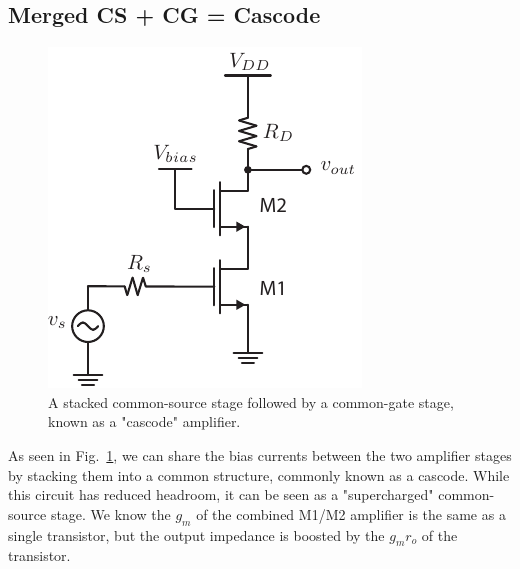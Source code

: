 \subsection{Merged CS + CG = Cascode}
\begin{figure}[tb]
\centering
\includegraphics[scale=1]{10cascode_dc}
\caption{A stacked common-source stage followed by a common-gate stage, known as a "cascode" amplifier.}
\label{fig:10cascode_dc}
\end{figure}
As seen in Fig.~\ref{fig:10cascode_dc}, we can share the bias currents between the two amplifier stages by stacking them into a common structure, commonly known as a cascode.  While this circuit has reduced headroom, it can be seen as a "supercharged" common-source stage.  We know the $g_m$ of the combined M1/M2 amplifier is the same as a single transistor, but the output impedance is boosted by the $g_m r_o$ of the transistor.
